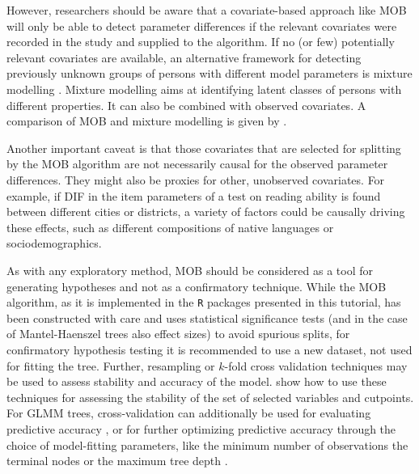 \documentclass[doc,floatsintext,natbib]{apa7}
\begin{document}
However, researchers should be aware that a covariate-based approach like MOB will only be able to detect parameter differences if the relevant covariates were recorded in the study and supplied to the algorithm. If no (or few) potentially relevant covariates are available, an alternative framework for detecting previously unknown groups of persons with different model parameters is mixture modelling \citep[see, e.g.,][in the context of Rasch modelling]{AyalySant17,FriStrZei:2015:EaPM}. Mixture modelling aims at identifying latent classes of persons with different properties. It can also be combined with observed covariates. A comparison of MOB and mixture modelling is given by \citet{FriStrZei:2014}.

Another important caveat is that those covariates that are selected for splitting by the MOB algorithm are not necessarily causal for the observed parameter differences. They might also be proxies for other, unobserved covariates. For example, if DIF in the item parameters of a test on reading ability is found between different cities or districts, a variety of factors could be causally driving these effects, such as different compositions of native languages or sociodemographics. 

As with any exploratory method, MOB should be considered as a tool for generating hypotheses and not as a confirmatory technique. While the MOB algorithm, as it is implemented in the \texttt{R} packages presented in this tutorial, has been constructed with care and uses statistical significance tests (and in the case of Mantel-Haenszel trees also effect sizes) to avoid spurious splits, for confirmatory hypothesis testing it is recommended to use a new dataset, not used for fitting the tree. Further, resampling or $k$-fold cross validation techniques may be used to assess stability and accuracy of the model. \cite{PhilyRusc18} show how to use these techniques for assessing the stability of the set of selected variables and cutpoints. For GLMM trees, cross-validation can additionally be used for evaluating predictive accuracy \cite[e.g., ]{RooiyWeed20}, or for further optimizing predictive accuracy through the choice of model-fitting parameters, like the minimum number of observations the terminal nodes or the maximum tree depth \cite{JameyWitt23}.  

\end{document}

